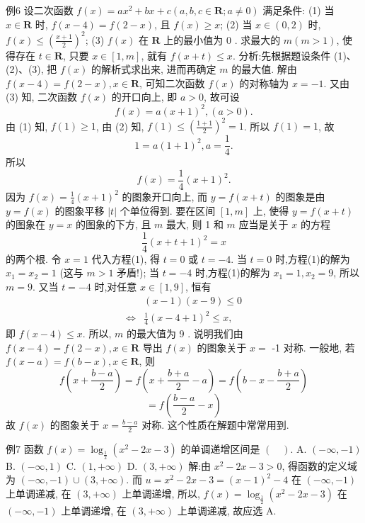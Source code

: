 例6 设二次函数 $f(x)=a x^2+b x+c(a, b, c \in \mathbf{R} ; a \neq 0)$ 满足条件:
(1) 当 $x \in \mathbf{R}$ 时, $f(x-4)=f(2-x)$, 且 $f(x) \geqslant x$;
(2) 当 $x \in(0,2)$ 时, $f(x) \leqslant\left(\frac{x+1}{2}\right)^2$;
(3) $f(x)$ 在 $\mathbf{R}$ 上的最小值为 0 .
求最大的 $m(m>1)$, 使得存在 $t \in \mathbf{R}$, 只要 $x \in[1, m]$, 就有 $f(x+t) \leqslant x$.
分析:先根据题设条件 (1)、(2)、(3), 把 $f(x)$ 的解析式求出来, 进而再确定 $m$ 的最大值.
解由 $f(x-4)=f(2-x), x \in \mathbf{R}$, 可知二次函数 $f(x)$ 的对称轴为 $x=-1$. 又由 (3) 知, 二次函数 $f(x)$ 的开口向上, 即 $a>0$, 故可设
$$
f(x)=a(x+1)^2,(a>0) .
$$
由 (1) 知, $f(1) \geqslant 1$, 由 (2) 知, $f(1) \leqslant\left(\frac{1+1}{2}\right)^2=1$.
所以 $f(1)=1$, 故
$$
1=a(1+1)^2, a=\frac{1}{4} .
$$
所以
$$
f(x)=\frac{1}{4}(x+1)^2 .
$$
因为 $f(x)=\frac{1}{4}(x+1)^2$ 的图象开口向上, 而 $y=f(x+t)$ 的图象是由 $y=f(x)$ 的图象平移 $|t|$ 个单位得到.
要在区间 $[1, m]$ 上, 使得 $y=f(x+t)$ 的图象在 $y=x$ 的图象的下方, 且 $m$ 最大, 则 1 和 $m$ 应当是关于 $x$ 的方程
$$
\frac{1}{4}(x+t+1)^2=x
$$
的两个根.
令 $x=1$ 代入方程(1), 得 $t=0$ 或 $t=-4$.
当 $t=0$ 时,方程(1)的解为 $x_1=x_2=1$ (这与 $m>1$ 矛盾!);
当 $t=-4$ 时,方程(1)的解为 $x_1=1, x_2=9$, 所以 $m=9$.
又当 $t=-4$ 时,对任意 $x \in[1,9]$, 恒有
$$
\begin{aligned}
& (x-1)(x-9) \leqslant 0 \\
\Leftrightarrow & \frac{1}{4}(x-4+1)^2 \leqslant x,
\end{aligned}
$$
即 $f(x-4) \leqslant x$.
所以, $m$ 的最大值为 9 .
说明我们由 $f(x-4)=f(2-x), x \in \mathbf{R}$ 导出 $f(x)$ 的图象关于 $x=$ -1 对称.
一般地, 若 $f(x-a)=f(b-x), x \in \mathbf{R}$, 则
$$
f\left(x+\frac{b-a}{2}\right)=f\left(x+\frac{b+a}{2}-a\right)=f\left(b-x-\frac{b+a}{2}\right)
$$
$$
=f\left(\frac{b-a}{2}-x\right)
$$
故 $f(x)$ 的图象关于 $x=\frac{b-a}{2}$ 对称.
这个性质在解题中常常用到.



例7 函数 $f(x)=\log _{\frac{1}{2}}\left(x^2-2 x-3\right)$ 的单调递增区间是 $(\quad)$.
A. $(-\infty,-1)$
B. $(-\infty, 1)$
C. $(1,+\infty)$
D. $(3,+\infty)$
解:由 $x^2-2 x-3>0$, 得函数的定义域为 $(-\infty,-1) \cup(3,+\infty)$.
而 $u=x^2-2 x-3=(x-1)^2-4$ 在 $(-\infty,-1)$ 上单调递减, 在 $(3,+\infty)$ 上单调递增, 所以, $f(x)=\log _{\frac{1}{2}}\left(x^2-2 x-3\right)$ 在 $(-\infty,-1)$ 上单调递增, 在 $(3,+\infty)$ 上单调递减, 故应选 $\mathrm{A}$.



